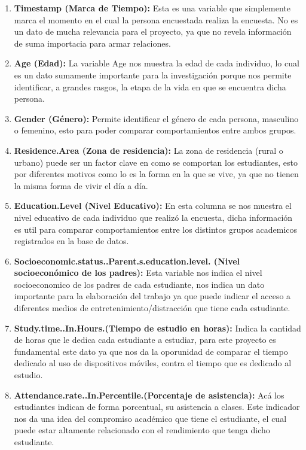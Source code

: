 \documentclass[12pt]{article}
\begin{document}
\begin{enumerate}
    \item \textbf{Timestamp (Marca de Tiempo):} Esta es una variable que simplemente marca el momento en el cual la persona encuestada realiza la encuesta. No es un dato de mucha relevancia para el proyecto, ya que no revela información de suma importacia para armar relaciones.
    
    \item \textbf{Age (Edad):} La variable Age nos muestra la edad de cada individuo, lo cual es un dato sumamente importante para la investigación porque nos permite identificar, a grandes rasgos, la etapa de la vida en que se encuentra dicha persona.
    
    \item \textbf{Gender (Género):} Permite identificar el género de cada persona, masculino o femenino, esto para poder comparar comportamientos entre ambos grupos.
    
    \item \textbf{Residence.Area (Zona de residencia):} La zona de residencia (rural o urbano) puede ser un factor clave en como se comportan los estudiantes, esto por diferentes motivos como lo es la forma en la que se vive, ya que no tienen la misma forma de vivir el día a día.
    
    \item \textbf{Education.Level (Nivel Educativo):} En esta columna se nos muestra el nivel educativo de cada individuo que realizó la encuesta, dicha información es util para comparar comportamientos entre los distintos grupos academicos registrados en la base de datos.
    
    \item \textbf{Socioeconomic.status..Parent.s.education.level. (Nivel socioeconómico de los padres):} Esta variable nos indica el nivel socioeconomico de los padres de cada estudiante, nos indica un dato importante para la elaboración del trabajo ya que puede indicar el acceso a diferentes medios de entretenimiento/distracción que tiene cada estudiante.
    
    \item \textbf{Study.time..In.Hours.(Tiempo de estudio en horas):} Indica la cantidad de horas que le dedica cada estudiante a estudiar, para este proyecto es fundamental este dato ya que nos da la oporunidad de comparar el tiempo dedicado al uso de dispositivos móviles, contra el tiempo que es dedicado al estudio.
    
    \item \textbf{Attendance.rate..In.Percentile.(Porcentaje de asistencia):} Acá los estudiantes indican de forma porcentual, su asistencia a clases. Este indicador nos da una idea del compromiso académico que tiene el estudiante, el cual puede estar altamente relacionado con el rendimiento que tenga dicho estudiante.
    

\end{enumerate}
\end{document}
